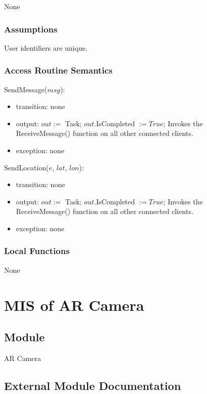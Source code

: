 \documentclass[12pt, titlepage]{article}
\begin{document}
None

\subsubsection{Assumptions}

User identifiers are unique.

\subsubsection{Access Routine Semantics}

\noindent SendMessage($msg$):
\begin{itemize}
\item transition: none
\item output: $out :=$ Task; $out$.IsCompleted $:= True$; Invokes the ReceiveMessage() function on all other connected clients. 
\item exception: none
\end{itemize}

\noindent SendLocation($e$, $lat$, $lon$):
\begin{itemize}
\item transition: none
\item output: $out :=$ Task; $out$.IsCompleted $:= True$; Invokes the ReceiveMessage() function on all other connected clients.
\item exception: none
\end{itemize}

\subsubsection{Local Functions}

None

\newpage

\section{MIS of AR Camera} \label{mARCamera}

\subsection{Module}

AR Camera

\subsection{External Module Documentation}
\end{document}
